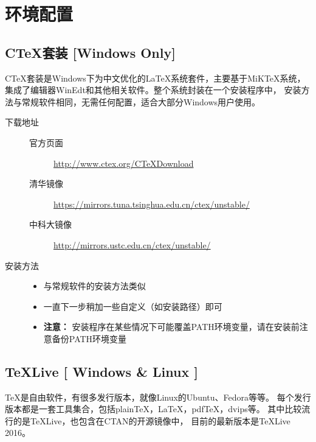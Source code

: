 \chapter{环境配置}

\section{C\TeX{}套装 [Windows Only]}

C\TeX{}套装是Windows下为中文优化的\LaTeX{}系统套件，主要基于MiKTeX系统，
集成了编辑器WinEdt和其他相关软件。整个系统封装在一个安装程序中，
安装方法与常规软件相同，无需任何配置，适合大部分Windows用户使用。

\begin{description}
    \item[下载地址] \hfill
    \begin{description}
        \item[官方页面]
            \url{http://www.ctex.org/CTeXDownload}
        \item[清华镜像]
            \url{https://mirrors.tuna.tsinghua.edu.cn/ctex/unstable/}
        \item[中科大镜像]
            \url{http://mirrors.ustc.edu.cn/ctex/unstable/}
    \end{description}
    \item[安装方法] \hfill
        \begin{itemize}
            \item[] 与常规软件的安装方法类似
            \item[] 一直下一步稍加一些自定义（如安装路径）即可
            \item[] {\bf 注意：} 安装程序在某些情况下可能覆盖PATH环境变量，请在安装前注意备份PATH环境变量
        \end{itemize}
\end{description}

\section{\TeX{}Live [ Windows \& Linux ]}

\TeX{}是自由软件，有很多发行版本，就像Linux的Ubuntu、Fedora等等。
每个发行版本都是一套工具集合，包括plain\TeX{}，\LaTeX{}，pdf\TeX{}，dvips等。
其中比较流行的是\TeX{}Live，也包含在CTAN的开源镜像中，
目前的最新版本是\TeX{}Live 2016。


